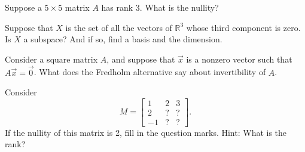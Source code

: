 \begin{exercise}
Suppose a $5 \times 5$ matrix $A$ has rank 3.  What is the nullity?
\end{exercise}

\begin{exercise}
Suppose that $X$ is the set of all the vectors of ${\mathbb{R}}^3$ whose
third component is zero.  Is $X$ a subspace?  And if so, find a basis
and the dimension.
\end{exercise}

\begin{exercise}
Consider a square matrix $A$, and suppose that $\vec{x}$ is a nonzero
vector such that $A \vec{x} = \vec{0}$.  What does the Fredholm alternative
say about invertibility of $A$.
\end{exercise}

\begin{exercise}
Consider
\begin{equation*}
M =
\begin{bmatrix}
1 & 2 & 3 \\
2 & ? & ? \\
-1 & ? & ?
\end{bmatrix} .
\end{equation*}
If the nullity of this matrix is 2, fill in the question marks.  Hint: What
is the rank?
\end{exercise}

\setcounter{exercise}{100}

